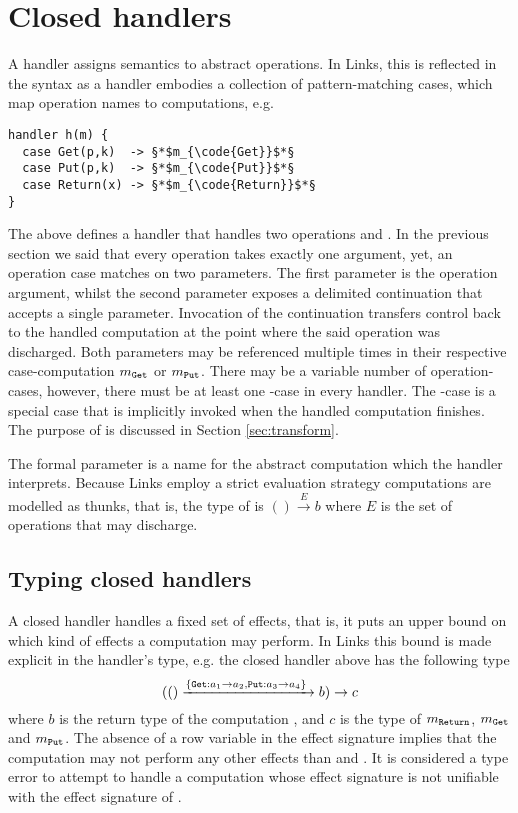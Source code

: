 \section{Closed handlers}\label{sec:closedhandlers}
A handler assigns semantics to abstract operations. In Links, this is reflected in the syntax as a handler embodies a collection of pattern-matching cases, which map operation names to computations, e.g.
\begin{lstlisting}[style=links]
handler h(m) {
  case Get(p,k)  -> §*$m_{\code{Get}}$*§
  case Put(p,k)  -> §*$m_{\code{Put}}$*§
  case Return(x) -> §*$m_{\code{Return}}$*§
}
\end{lstlisting}
The above defines a handler  that handles two operations  and .
In the previous section we said that every operation takes exactly one argument, yet, an operation case matches on two parameters. The first parameter  is the operation argument, whilst the second parameter  exposes a delimited continuation that accepts a single parameter. Invocation of the continuation transfers control back to the handled computation  at the point where the said operation was discharged. Both parameters may be referenced multiple times in their respective case-computation $m_{\texttt{Get}}$ or $m_{\texttt{Put}}$.
There may be a variable number of operation-cases, however, there must be at least one -case in every handler. The -case is a special case that is implicitly invoked when the handled computation  finishes. The purpose of  is discussed in Section \ref{sec:transform}.

The formal parameter  is a name for the abstract computation which the handler interprets. Because Links employ a strict evaluation strategy computations are modelled as thunks, that is, the type of  is $() \xrightarrow{E} b$ where $E$ is the set of operations that  may discharge.

\subsection{Typing closed handlers}
A closed handler handles a fixed set of effects, that is, it puts an upper bound on which kind of effects a computation may perform. In Links this bound is made explicit in the handler's type, e.g. the closed handler  above has the following type
\[ (() \xrightarrow{ \{\texttt{Get}: a_1 \to a_2, \texttt{Put}: a_3 \to a_4 \}\;} b) \to c \]
where $b$ is the return type of the computation , and $c$ is the type of $m_{\texttt{Return}}$, $m_{\texttt{Get}}$ and $m_{\texttt{Put}}$.
The absence of a row variable in the effect signature implies that the computation  may not perform any other effects than  and . It is considered a type error to attempt to handle a computation whose effect signature is not unifiable with the effect signature of .

